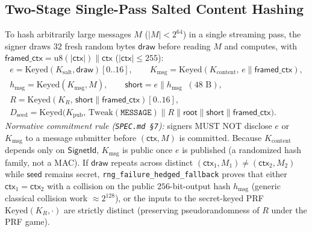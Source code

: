 \documentclass[11pt,a4paper]{article}
\theoremstyle{definition}
\theoremstyle{remark}
\newcommand{\Keyed}{\mathrm{Keyed}}
\newcommand{\Tweak}{\mathrm{Tweak}}
\begin{document}
\subsection{Two-Stage Single-Pass Salted Content Hashing}
\label{sec:content-hash}
To hash arbitrarily large messages $M$ ($|M| < 2^{64}$) in a single streaming pass, the signer draws $32$ fresh random bytes $\mathsf{draw}$ before reading $M$ and computes, with $\mathsf{framed\_ctx} = \mathrm{u8}(|\mathsf{ctx}|) \parallel \mathsf{ctx}$ ($|\mathsf{ctx}| \le 255$):
\begin{gather*}
  e = \Keyed(K_{\mathrm{salt}}, \mathsf{draw})[0..16], \qquad
  K_{\mathrm{msg}} = \Keyed(K_{\mathrm{content}},\, e \parallel \mathsf{framed\_ctx}), \\
  h_{\mathrm{msg}} = \Keyed(K_{\mathrm{msg}}, M), \qquad
  \mathsf{short} = e \parallel h_{\mathrm{msg}} \;\;(48\text{ B}), \\
  R = \Keyed(K_R,\, \mathsf{short} \parallel \mathsf{framed\_ctx})[0..16], \\
  D_{\mathrm{seed}} = \Keyed\!\big(K_{\mathrm{pub}},\, \Tweak(\mathtt{MESSAGE}) \parallel R \parallel \mathsf{root} \parallel \mathsf{short} \parallel \mathsf{framed\_ctx}\big).
\end{gather*}
\emph{Normative commitment rule (\texttt{SPEC.md §7}):} signers MUST NOT disclose $e$ or $K_{\mathrm{msg}}$ to a message submitter before $(\mathsf{ctx}, M)$ is committed. Because $K_{\mathrm{content}}$ depends only on $\mathsf{SignetId}$, $K_{\mathrm{msg}}$ is public once $e$ is published (a randomized hash family, not a MAC). If $\mathsf{draw}$ repeats across distinct $(\mathsf{ctx}_1, M_1) \neq (\mathsf{ctx}_2, M_2)$ while $\mathsf{seed}$ remains secret, \texttt{rng\_\allowbreak failure\_\allowbreak hedged\_\allowbreak fallback} proves that either $\mathsf{ctx}_1 = \mathsf{ctx}_2$ with a collision on the public $256$-bit-output hash $h_{\mathrm{msg}}$ (generic classical collision work $\approx 2^{128}$), or the inputs to the secret-keyed PRF $\Keyed(K_R, \cdot)$ are strictly distinct (preserving pseudorandomness of $R$ under the PRF game).
\end{document}
